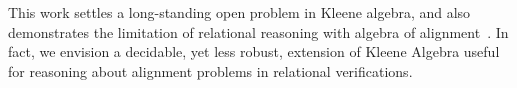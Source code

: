 \documentclass[11pt,a4paper,sans]{moderncv} %
\begin{document}
This work settles a long-standing open problem in Kleene algebra, and also demonstrates the limitation of relational reasoning with algebra of alignment~\cite{antonopoulos_AlgebraAlignmentRelational_2023}. In fact, we envision a decidable, yet less robust, extension of Kleene Algebra useful for reasoning about alignment problems in relational verifications.




\newpage
\printbibliography %
\end{document}

